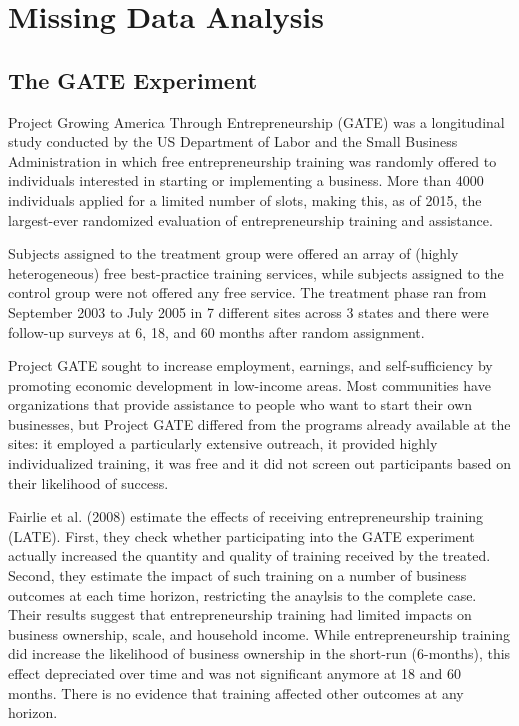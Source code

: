 
\section{Missing Data Analysis}

\subsection{The GATE Experiment}
Project Growing America Through Entrepreneurship (GATE) was a longitudinal study conducted by the US Department of Labor and the Small Business Administration in which free entrepreneurship training was randomly offered to individuals interested in starting or implementing a business. More than 4000 individuals applied for a limited number of slots, making this, as of 2015, the largest-ever randomized evaluation of entrepreneurship training and assistance.

Subjects assigned to the treatment group were offered an array of (highly heterogeneous) free best-practice training services, while subjects assigned to the control group were not offered any free service. The treatment phase ran from September 2003 to July 2005 in 7 different sites across 3 states and there were follow-up surveys at 6, 18, and 60 months after random assignment.

Project GATE sought to increase employment, earnings, and self-sufficiency by promoting economic development in low-income areas. Most communities have organizations that provide assistance to people who want to start their own businesses, but Project GATE differed from the programs already available at the sites: it employed a particularly extensive outreach, it provided highly individualized training, it was free and it did not screen out participants based on their likelihood of success.

Fairlie et al. (2008) estimate the effects of receiving entrepreneurship training (LATE). First, they check whether participating into the GATE experiment actually increased the quantity and quality of training received by the treated. Second, they estimate the impact of such training on a number of business outcomes at each time horizon, restricting the anaylsis to the complete case. Their results suggest that entrepreneurship training had limited impacts on business ownership, scale, and household income. While entrepreneurship training did increase the likelihood of business ownership in the short-run (6-months), this effect depreciated over time and was not significant anymore at 18 and 60 months. There is no evidence that training affected other outcomes at any horizon.

